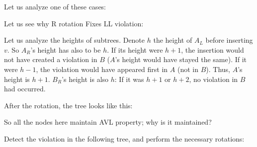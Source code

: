 Let us analyze one of these cases:
\begin{example} Let us see why R rotation Fixes LL violation:
\begin{figure}[h]
  \centering
      
\end{figure}

Let us analyze the heights of subtrees. Denote $h$ the height of $A_L$ before inserting $v$. So $A_R$'s height has also to be $h$.
If its height were $h+1$, the insertion would not have created a violation in
$B$ ($A$'s height would have stayed the same). If it were $h-1$, the violation would have appeared first in $A$ (not in $B$). Thus, $A$'s height is $h+1$. $B_R$'s height is also $h$: If it was $h+1$ or $h+2$, no violation in $B$ had
occurred.

After the rotation, the tree looks like this:
\begin{figure}[h]
  \centering
\end{figure}
So all the nodes here maintain AVL property; why is it maintained?
\end{example}
Detect the violation in the following tree, and perform the necessary rotations:
